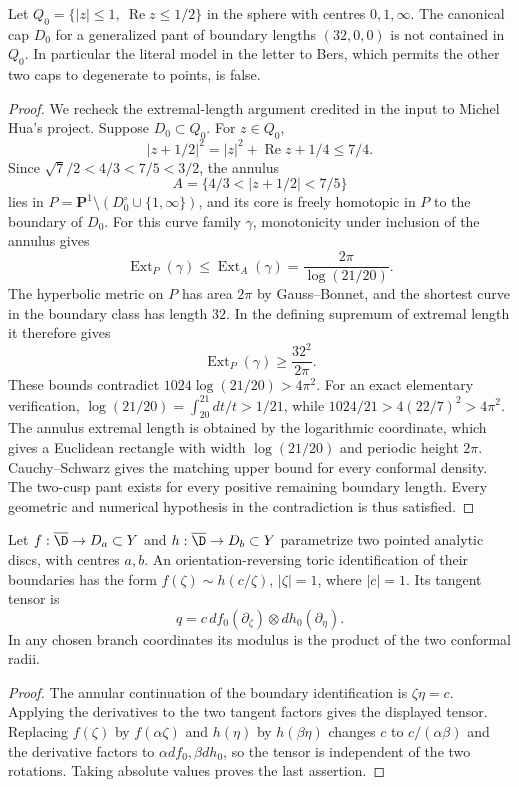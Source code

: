 \begin{proposition}\label{A4-orange-extremal}
Let $Q_0=\{|z|\leq1,\ \operatorname{Re}z\leq1/2\}$ in the sphere with centres $0,1,\infty$. The canonical cap $D_0$ for a generalized pant of boundary lengths $(32,0,0)$ is not contained in $Q_0$. In particular the literal model in the letter to Bers, which permits the other two caps to degenerate to points, is false.
\end{proposition}
\begin{proof}
We recheck the extremal-length argument credited in the input to Michel Hua's project. Suppose $D_0\subset Q_0$. For $z\in Q_0$,
\[
 |z+1/2|^2=|z|^2+\operatorname{Re}z+1/4\leq7/4.
\]
Since $\sqrt7/2<4/3<7/5<3/2$, the annulus
\[
 A=\{4/3<|z+1/2|<7/5\}
\]
lies in $P=\mathbf P^1\setminus(D_0^\circ\cup\{1,\infty\})$, and its core is freely homotopic in $P$ to the boundary of $D_0$. For this curve family $\gamma$, monotonicity under inclusion of the annulus gives
\[
\operatorname{Ext}_P(\gamma)\leq\operatorname{Ext}_A(\gamma)
=\frac{2\pi}{\log(21/20)}.
\]
The hyperbolic metric on $P$ has area $2\pi$ by Gauss--Bonnet, and the shortest curve in the boundary class has length $32$. In the defining supremum of extremal length it therefore gives
\[
\operatorname{Ext}_P(\gamma)\geq\frac{32^2}{2\pi}.
\]
These bounds contradict $1024\log(21/20)>4\pi^2$. For an exact elementary verification, $\log(21/20)=\int_{20}^{21}dt/t>1/21$, while $1024/21>4(22/7)^2>4\pi^2$. The annulus extremal length is obtained by the logarithmic coordinate, which gives a Euclidean rectangle with width $\log(21/20)$ and periodic height $2\pi$. Cauchy--Schwarz gives the matching upper bound for every conformal density. The two-cusp pant exists for every positive remaining boundary length. Every geometric and numerical hypothesis in the contradiction is thus satisfied.
\end{proof}

\begin{lemma}\label{A1-tensor}
Let $f:\overline\D\to D_a\subset Y$ and $h:\overline\D\to D_b\subset Y$ parametrize two pointed analytic discs, with centres $a,b$. An orientation-reversing toric identification of their boundaries has the form $f(\zeta)\sim h(c/\zeta)$, $|\zeta|=1$, where $|c|=1$. Its tangent tensor is
\[
q=c\,df_0(\partial_\zeta)\otimes dh_0(\partial_\eta).
\]
In any chosen branch coordinates its modulus is the product of the two conformal radii.
\end{lemma}
\begin{proof}
The annular continuation of the boundary identification is $\zeta\eta=c$. Applying the derivatives to the two tangent factors gives the displayed tensor. Replacing $f(\zeta)$ by $f(\alpha\zeta)$ and $h(\eta)$ by $h(\beta\eta)$ changes $c$ to $c/(\alpha\beta)$ and the derivative factors to $\alpha df_0,\beta dh_0$, so the tensor is independent of the two rotations. Taking absolute values proves the last assertion.
\end{proof}

